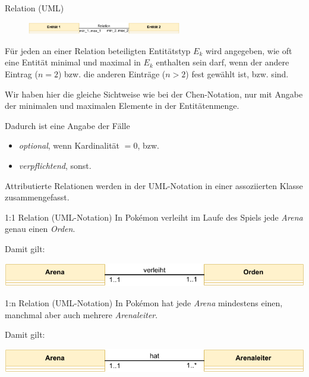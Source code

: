 \begin{defi}{Relation (UML)}
    \begin{figure}
        \begin{center}
            \includegraphics[width=0.6\textwidth]{includes/figures/definition_uml_relation.pdf}
        \end{center}
    \end{figure}
    Für jeden an einer Relation beteiligten Entitätstyp $E_k$ wird angegeben, wie oft eine Entität minimal und maximal in $E_k$ enthalten sein darf, wenn der andere Eintrag ($n=2$) bzw. die anderen Einträge ($n>2$) fest gewählt ist, bzw. sind.

    Wir haben hier die gleiche Sichtweise wie bei der Chen-Notation, nur mit Angabe der minimalen und maximalen Elemente in der Entitätenmenge.

    Dadurch ist eine Angabe der Fälle
    \begin{itemize}
        \item \emph{optional}, wenn Kardinalität $= 0$, bzw.
        \item \emph{verpflichtend}, sonst.
    \end{itemize}

    Attributierte Relationen werden in der UML-Notation in einer assoziierten Klasse zusammengefasst.
\end{defi}

\newpage

\begin{example}{1:1 Relation (UML-Notation)}
    In Pokémon verleiht im Laufe des Spiels jede \emph{Arena} genau einen \emph{Orden}.

    Damit gilt:
    \begin{center}
        \includegraphics[width=0.7\linewidth]{includes/figures/example_entity_relationship_modell_uml_one_to_one.pdf}
    \end{center}
\end{example}

\begin{example}{1:n Relation (UML-Notation)}
    In Pokémon hat jede \emph{Arena} mindestens einen, manchmal aber auch mehrere \emph{Arenaleiter}.

    Damit gilt:
    \begin{center}
        \includegraphics[width=0.7\linewidth]{includes/figures/example_entity_relationship_modell_uml_one_to_many.pdf}
    \end{center}
\end{example}

